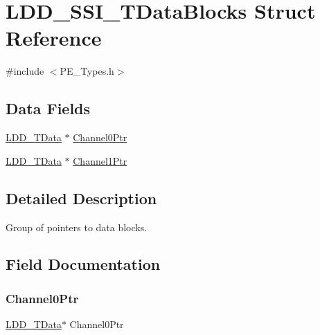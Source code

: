 \hypertarget{struct_l_d_d___s_s_i___t_data_blocks}{}\section{L\+D\+D\+\_\+\+S\+S\+I\+\_\+\+T\+Data\+Blocks Struct Reference}
\label{struct_l_d_d___s_s_i___t_data_blocks}


{\ttfamily \#include $<$P\+E\+\_\+\+Types.\+h$>$}

\subsection*{Data Fields}
\begin{DoxyCompactItemize}
\item 
\hyperlink{group___p_e___types__module_gade8ef9401405bd941b6da738b807f980}{L\+D\+D\+\_\+\+T\+Data} $\ast$ \hyperlink{struct_l_d_d___s_s_i___t_data_blocks_ab8e13dd27591e16a7cc57fa28181a24b}{Channel0\+Ptr}
\item 
\hyperlink{group___p_e___types__module_gade8ef9401405bd941b6da738b807f980}{L\+D\+D\+\_\+\+T\+Data} $\ast$ \hyperlink{struct_l_d_d___s_s_i___t_data_blocks_ac3d326ecc3091d02f4b70e0d09a25c3e}{Channel1\+Ptr}
\end{DoxyCompactItemize}


\subsection{Detailed Description}
Group of pointers to data blocks. 

\subsection{Field Documentation}
\mbox{\label{struct_l_d_d___s_s_i___t_data_blocks_ab8e13dd27591e16a7cc57fa28181a24b}} 
\subsubsection{\texorpdfstring{Channel0\+Ptr}{Channel0Ptr}}
{\footnotesize\ttfamily \hyperlink{group___p_e___types__module_gade8ef9401405bd941b6da738b807f980}{L\+D\+D\+\_\+\+T\+Data}$\ast$ Channel0\+Ptr}

